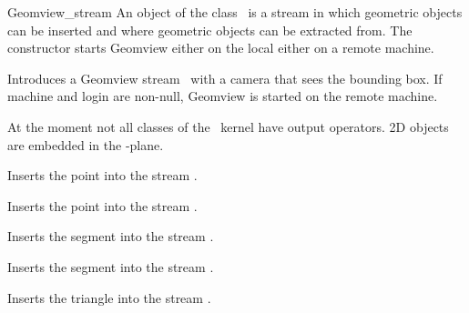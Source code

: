 \begin{ccClass}{Geomview_stream}
\ccDefinition
An object of the class \ccClassName\ is a stream in which geometric
objects can be inserted and where geometric objects can be extracted
from. The constructor starts Geomview either on the local either on
a remote machine.


\ccThreeToTwo
\ccCreation
{}

{Introduces a Geomview stream \ccVar\ with a camera that sees the
bounding box. If machine and login are non-null, Geomview is started
on the remote machine.}



\ccOperations



\def\ccTagRmEigenClassName{\ccFalse}

At the moment not all classes of the \cgal\ kernel have output
operators. 2D objects are embedded in the -plane.

{Inserts the point  into the stream \ccVar.}


{Inserts the point  into the stream \ccVar.}


{Inserts the segment  into the stream \ccVar.}

{Inserts the segment  into the stream \ccVar.}


{Inserts the triangle  into the stream \ccVar.}



\end{ccClass}
